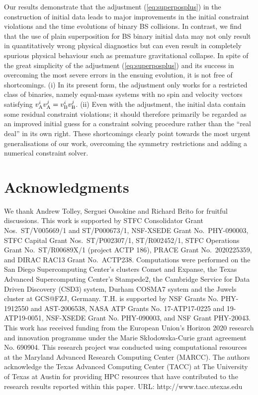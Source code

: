 \documentclass[11pt]{report}  %
\begin{document}
Our results demonstrate that
the adjustment (\ref{eq:superposplus}) in the construction of initial
data leads to major improvements in the initial constraint violations and the
time evolutions of binary BS collisions. In contrast, we find that the use of plain
superposition for BS binary initial data may not only result in quantitatively
wrong physical diagnostics but can even result in completely spurious physical behaviour
such as premature gravitational collapse. In spite of the great simplicity of the
adjustment (\ref{eq:superposplus}) and its success in overcoming the most
severe errors in the ensuing evolution, it is not free of shortcomings.
(i) In its present form, the adjustment only works for a restricted class of
binaries, namely equal-mass systems with no spin and velocity vectors
satisfying $v_{\rm A}^i v_{\rm A}^j=v_{\rm B}^i v_{\rm B}^j$. (ii) Even with
the adjustment, the initial data contain some residual constraint violations;
it should therefore primarily be regarded as an improved initial guess for
a constraint solving procedure rather than the ``real deal'' in its own right.
These shortcomings clearly point towards the most urgent generalisations of our
work, overcoming the symmetry restrictions and adding a numerical constraint
solver.


\section*{Acknowledgments}
We thank Andrew Tolley, Serguei Ossokine and Richard Brito for fruitful discussions.
This work is supported by
STFC Consolidator Grant Nos.~ST/V005669/1 and ST/P000673/1,
NSF-XSEDE Grant No.~PHY-090003,
STFC Capital Grant Nos.~ST/P002307/1, ST/R002452/1,
STFC Operations Grant No.~ST/R00689X/1 (project ACTP 186),
PRACE Grant No.~2020225359,
and
DIRAC RAC13 Grant No.~ACTP238.
Computations were performed on
the San Diego Supercomputing Center's clusters Comet and Expanse,
the Texas Advanced Supercomputing Center's Stampede2,
the Cambridge Service for Data Driven Discovery (CSD3) system, Durham COSMA7 system
and
the Juwels cluster at GCS@FZJ, Germany.
T.H. is supported by NSF Grants No. PHY-1912550 and AST-2006538, NASA ATP Grants No. 17-ATP17-0225 and 19-ATP19-0051, NSF-XSEDE Grant No. PHY-090003, and NSF Grant PHY-20043. This work has received funding from the European Union’s Horizon 2020 research and innovation programme under the Marie Skłodowska-Curie grant agreement No. 690904. This research project was conducted using computational resources at the Maryland Advanced Research Computing Center (MARCC).
The authors acknowledge the Texas Advanced Computing Center (TACC) at The University of Texas at Austin for providing HPC resources that have contributed to the research results reported within this paper. URL: http://www.tacc.utexas.edu \cite{10.1145/3311790.3396656}
\end{document}
